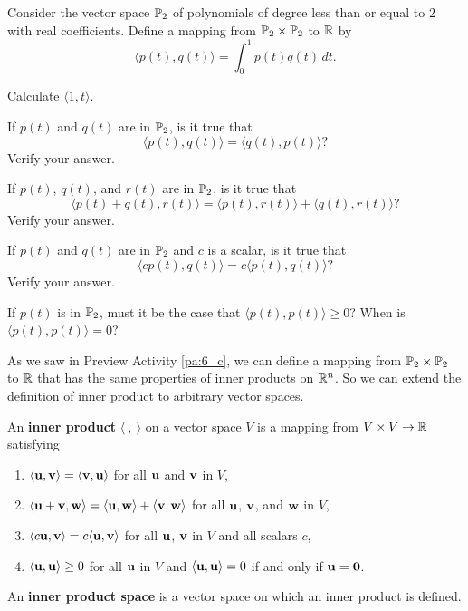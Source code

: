 \begin{pa} \label{pa:6_c} Consider the vector space $\mathbb{P}_2$ of polynomials of degree less than or equal to $2$ with real coefficients. Define a mapping from $\mathbb{P}_2 \times \mathbb{P}_2$ to $\mathbb{R}$ by
\[\langle p(t), q(t) \rangle = \int_0^1 p(t)q(t) \, dt.\]
 
\be
\item Calculate $\langle 1, t \rangle$. 
	
\item If $p(t)$ and $q(t)$ are in $\mathbb{P}_2$, is it true that 
	\[ \langle p(t) , q(t) \rangle = \langle q(t), p(t) \rangle?\]
	Verify your answer.
	
\item If $p(t)$, $q(t)$, and $r(t)$ are in $\mathbb{P}_2$, is it true that 
	\[\langle p(t)+q(t), r(t) \rangle = \langle p(t), r(t) \rangle + \langle q(t), r(t) \rangle?\]
	Verify your answer.
	
\item If $p(t)$ and $q(t)$ are in $\mathbb{P}_2$ and $c$ is a scalar, is it true that 
\[\langle cp(t) , q(t) \rangle = c\langle p(t) , q(t) \rangle?\]
Verify your answer. 

\item If $p(t)$ is in $\mathbb{P}_2$, must it be the case that $\langle p(t) , p(t) \rangle \geq 0$? When is $\langle p(t) , p(t) \rangle = 0$?
 
\ee

\end{pa}

 

As we saw in Preview Activity \ref{pa:6_c}, we can define a mapping from $\mathbb{P}_2 \times \mathbb{P}_2$ to $\mathbb{R}$ that has the same properties of inner products on $\mathbb{R}^n$. So we can extend the definition of inner product to arbitrary vector spaces.  

\begin{definition} \label{def:6_c_inner_product}  An \textbf{inner product} $\langle \ , \ \rangle$ on a vector space $V$ is a mapping from $V \times V \to \mathbb{R}$ satisfying
\begin{enumerate}
\item $\langle \mathbf{u} , \mathbf{v} \rangle = \langle \mathbf{v} , \mathbf{u} \rangle$ for all $\mathbf{u}$ and $\mathbf{v}$ in $V$,
\item $\langle \mathbf{u} + \mathbf{v} , \mathbf{w} \rangle = \langle \mathbf{u} , \mathbf{w} \rangle + \langle \mathbf{v} , \mathbf{w} \rangle$ for all $\mathbf{u}$, $\mathbf{v}$, and $\mathbf{w}$ in $V$,
\item $\langle c\mathbf{u} , \mathbf{v} \rangle = c\langle \mathbf{u} , \mathbf{v} \rangle$ for all $\mathbf{u}$, $\mathbf{v}$ in $V$ and all scalars $c$,
\item $\langle \mathbf{u} , \mathbf{u} \rangle \geq 0$ for all $\mathbf{u}$ in $V$ and $\langle \mathbf{u} , \mathbf{u} \rangle = 0$ if and only if $\mathbf{u} = \mathbf{0}$.
\end{enumerate}
An \textbf{inner product space} is a vector space on which an inner product is defined.
\end{definition} 

